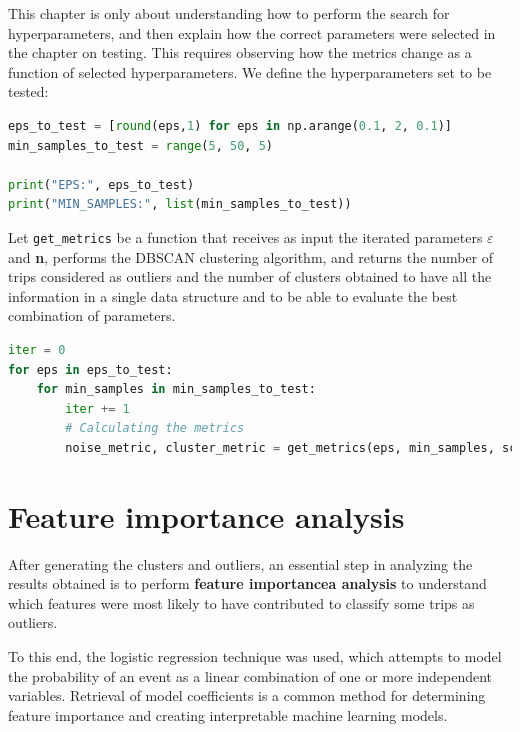 This chapter is only about understanding how to perform the search for hyperparameters, and then explain how the correct parameters were selected in the chapter on testing.
This requires observing how the metrics change as a function of selected hyperparameters. We define the hyperparameters set to be tested:

\begin{minipage}{\linewidth}
\begin{lstlisting}[language=Python]
eps_to_test = [round(eps,1) for eps in np.arange(0.1, 2, 0.1)]
min_samples_to_test = range(5, 50, 5)

print("EPS:", eps_to_test)
print("MIN_SAMPLES:", list(min_samples_to_test))
\end{lstlisting}
\end{minipage}

Let \verb|get_metrics| be a function that receives as input the iterated parameters $\varepsilon$ and \textbf{n}, performs the DBSCAN clustering algorithm, and returns the number of trips considered as outliers and the number of clusters obtained to have all the information in a single data structure and to be able to evaluate the best combination of parameters.

\begin{minipage}{\linewidth}
\begin{lstlisting}[language=Python]
iter = 0
for eps in eps_to_test:
    for min_samples in min_samples_to_test:
        iter += 1
        # Calculating the metrics
        noise_metric, cluster_metric = get_metrics(eps, min_samples, scaled_df, iter)
\end{lstlisting}
\end{minipage}

\section{Feature importance analysis}
\label{sec:importance}

After generating the clusters and outliers, an essential step in analyzing the results obtained is to perform \textbf{feature importancea analysis} to understand which features were most likely to have contributed to classify some trips as outliers.

To this end, the logistic regression technique was used, which attempts to model the probability of an event as a linear combination of one or more independent variables. Retrieval of model coefficients is a common method for determining feature importance and creating interpretable machine learning models.


